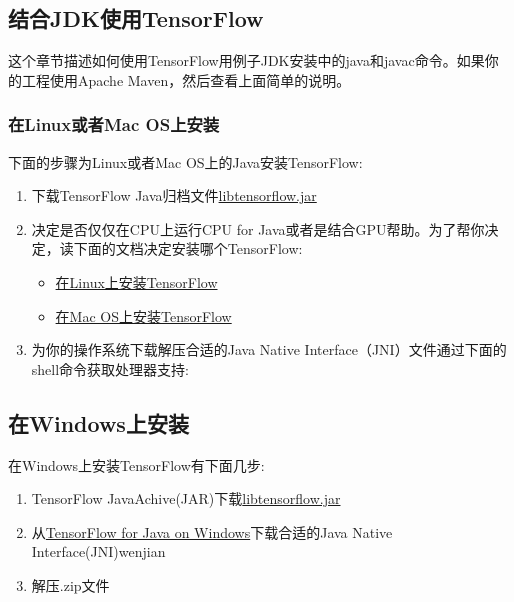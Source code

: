 \subsection{结合JDK使用TensorFlow}
这个章节描述如何使用TensorFlow用例子JDK安装中的java和javac命令。如果你的工程使用Apache Maven，然后查看上面简单的说明。
\subsubsection{在Linux或者Mac OS上安装}
下面的步骤为Linux或者Mac OS上的Java安装TensorFlow:
\begin{enumerate}
\item 下载TensorFlow Java归档文件\href{https://storage.googleapis.com/tensorflow/libtensorflow/libtensorflow-1.4.1.jar}{libtensorflow.jar}
\item 决定是否仅仅在CPU上运行CPU for Java或者是结合GPU帮助。为了帮你决定，读下面的文档决定安装哪个TensorFlow:
\begin{itemize}
\item \href{https://www.tensorflow.org/install/install_linux#determine_which_tensorflow_to_install}{在Linux上安装TensorFlow}
\item \href{https://www.tensorflow.org/install/install_mac#determine_which_tensorflow_to_install}{在Mac OS上安装TensorFlow}
\end{itemize}
\item 为你的操作系统下载解压合适的Java Native Interface（JNI）文件通过下面的shell命令获取处理器支持:
\end{enumerate}
\subsection{在Windows上安装}
在Windows上安装TensorFlow有下面几步:
\begin{enumerate}
\item TensorFlow JavaAchive(JAR)下载\href{https://storage.googleapis.com/tensorflow/libtensorflow/libtensorflow-1.4.1.jar}{libtensorflow.jar}
\item 从\href{https://storage.googleapis.com/tensorflow/libtensorflow/libtensorflow_jni-cpu-windows-x86_64-1.4.1.zip}{TensorFlow for Java on Windows}下载合适的Java Native Interface(JNI)wenjian 
\item 解压.zip文件
\end{enumerate}
